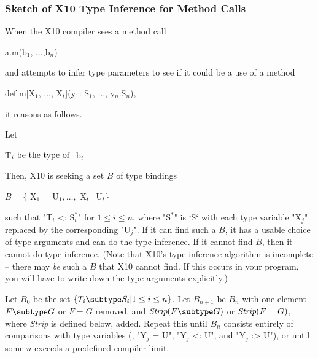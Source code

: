 {\begin{ex}
\end{ex}


\subsubsection{Sketch of X10 Type Inference for Method Calls}

When the X10 compiler sees a method call 
\begin{xtenmath}
a.m(b$_1$, $\ldots$,b$_n$)
\end{xtenmath}
and attempts to infer type parameters to
see if it could be a use of a
method 
\begin{xtenmath}
def m[X$_1$, $\ldots$, X$_t$](y$_1$: S$_1$, $\ldots$, y$_n$:S$_n$),
\end{xtenmath}
it reasons as follows. 



Let 
\begin{xtenmath}
T$_i \mbox{\rm ~be the type of }$ b$_i$
\end{xtenmath}
Then, X10 is seeking a
set {$B$}  of type 
bindings 
\begin{xtenmath}
$B = \{$ X$_1$ = U$_1, \ldots, $ X$_t$=U$_t\}$
\end{xtenmath}
such that 
\xcdmath"T$_i$ <: S$^*_i$" for {$1 \le i \le n$}, where \xcdmath"S$^*$" is
\xcd`S` with each type variable \xcdmath"X$_j$" replaced by the corresponding
\xcdmath"U$_j$".  If it can find such a {$B$}, it has a usable choice of type
arguments and can do the type inference.  If it cannot find {$B$}, then it
cannot do type inference.    (Note that X10's type inference algorithm is
incomplete -- there may {\em be} such a {$B$} that X10 cannot find.  If this
occurs in your program, you will have to write down the type arguments
explicitly.) 

Let $B_0$ be the set {$\{ T_i \subtype S_i | 1 \le i \le n\}$}.  Let
{$B_{n+1}$} be {$B_n$} with one element {$F \subtype G$} or 
{$F = G$} removed, and
{$\mbox{\it Strip}(F \subtype G)$} 
or {$\mbox{\it Strip}(F = G)$}, where     {\em Strip} is defined below, added.  Repeat this until 
{$B_n$} consists entirely of comparisons with type variables (\viz, 
\xcdmath"Y$_j$ = U", 
\xcdmath"Y$_j$ <: U", and
\xcdmath"Y$_j$ :> U"), 
or until some {$n$} exceeds a predefined compiler limit. 

}
